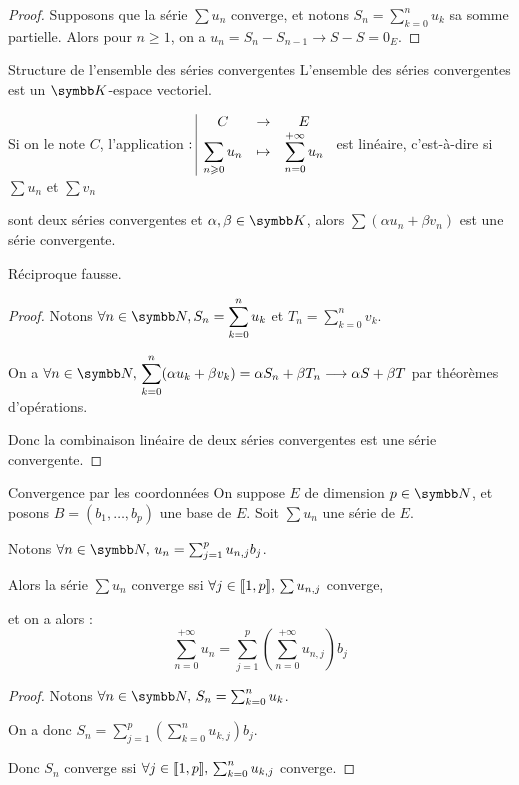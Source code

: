 \begin{proof}
    Supposons que la série $\sum u_n$ converge, et notons $\displaystyle S_n = \sum_{k=0}^n u_k$ sa somme partielle.
    Alors pour $n \geqslant 1$, on a $u_n = S_n - S_{n-1} \longrightarrow S - S = 0_E$.
\end{proof}

\begin{proposition}{Structure de l'ensemble des séries convergentes}{}
    L'ensemble des séries convergentes est un $\K$-espace vectoriel.

    Si on le note $C$, l'application $: \space \begin{array}{|ccc} \displaystyle C & \to & \displaystyle E \\ \displaystyle \sum_{n \geqslant 0} u_n & \mapsto & \displaystyle \sum_{n = 0}^{+\infty} u_n \end{array}$ 
    est linéaire, c'est-à-dire si $\sum u_n$ et $\sum v_n$
    
    \svspace sont deux séries convergentes et $\alpha, \beta \in \K$, alors $\sum (\alpha u_n + \beta v_n)$ est une série convergente.
\end{proposition}

\begin{remarque}
    Réciproque fausse.
\end{remarque}

\begin{proof}
    Notons $\forall n \in \N, S_n = \displaystyle \sum_{k=0}^n u_k$ et $T_n = \displaystyle \sum_{k=0}^n v_k$.

    On a $\displaystyle \forall n \in \N, \, \sum_{k=0}^n (\alpha u_k + \beta v_k) = \alpha S_n + \beta T_n \longrightarrow \alpha S + \beta T$
    par théorèmes d'opérations. 

    Donc la combinaison linéaire de deux séries convergentes est une série convergente.
\end{proof}

\begin{proposition}{Convergence par les coordonnées}{}
    On suppose $E$ de dimension $p \in \N$, et posons $B = (b_1, \ldots, b_p)$ une base de $E$.
    Soit $\sum u_n$ une série de $E$. 

    Notons $\forall n \in \N, \, u_n = \sum_{j = 1 }^p u_{n,j} b_j$. 

    Alors la série $\sum u_n$ converge ssi $\forall j \in [\![1, p]\!], \, \sum u_{n,j}$ converge, 

    et on a alors :
    \[\sum_{n = 0}^{+\infty} u_n = \sum_{j = 1}^p \left( \sum_{n = 0}^{+\infty} u_{n,j} \right) b_j\]
\end{proposition}

\begin{proof}
    Notons $\forall n \in \N, \, S_n = \sum_{k=0}^n u_k$. 

    On a donc $\displaystyle S_n = \sum_{j=1}^p \left( \sum_{k = 0}^{n} u_{k, j} \right) b_j$. 

    Donc $S_n$ converge ssi $\forall j \in [\![1, p]\!], \, \sum_{k=0}^n u_{k, j}$ converge.
\end{proof}

